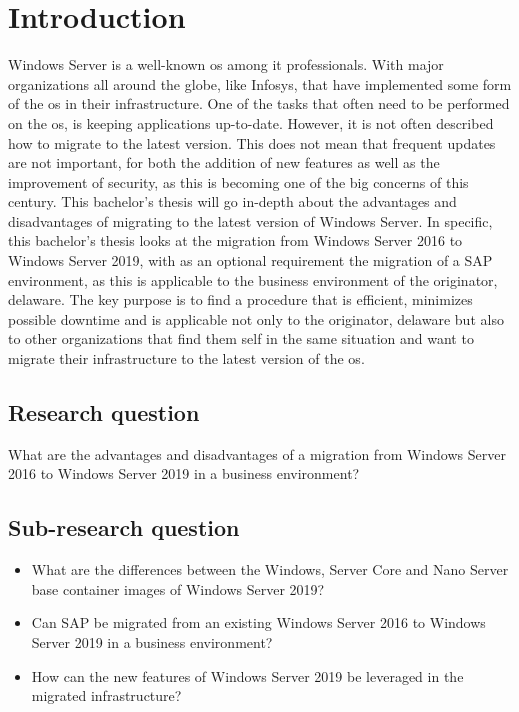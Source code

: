 \section{Introduction}\label{sec:introduction}
Windows Server is a well-known \acrfull{os} among \acrfull{it} professionals. With major organizations all around the globe, like Infosys, that have implemented some form of the \acrshort{os} in their infrastructure. \autocite{S.Chauhan2015}
One of the tasks that often need to be performed on the \acrshort{os}, is keeping applications up-to-date. 
However, it is not often described how to migrate to the latest version.  
This does not mean that frequent updates are not important, for both the addition of new features as well as the improvement of security, as this is becoming one of the big concerns of this century. 
This bachelor's thesis will go in-depth about the advantages and disadvantages of migrating to the latest version of Windows Server.
In specific, this bachelor's thesis looks at the migration from Windows Server 2016 to Windows Server 2019, with as an optional requirement the migration of a SAP environment, as this is applicable to the business environment of the originator, delaware.
The key purpose is to find a procedure that is efficient, minimizes possible downtime and is applicable not only to the originator, delaware but also to other organizations that find them self in the same situation and want to migrate their infrastructure to the latest version of the \acrshort{os}.
\subsection{Research question}
What are the advantages and disadvantages of a migration from Windows Server 2016 to Windows Server 2019 in a business environment?
\subsection{Sub-research question}
\begin{itemize}
	\item What are the differences between the Windows, Server Core and Nano Server base container images of Windows Server 2019?
	\item Can SAP be migrated from an existing Windows Server 2016 to Windows Server 2019 in a business environment?
	\item How can the new features of Windows Server 2019 be leveraged in the migrated infrastructure? 
\end{itemize}
